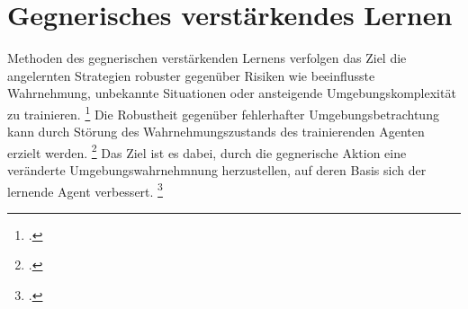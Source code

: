 \section{Gegnerisches verstärkendes Lernen}
Methoden des gegnerischen verstärkenden Lernens verfolgen das Ziel die angelernten Strategien robuster gegenüber Risiken wie beeinflusste Wahrnehmung, unbekannte Situationen oder ansteigende Umgebungskomplexität zu trainieren. \footcite[Vgl.][S. 2]{Schott.2022} %
Die Robustheit gegenüber fehlerhafter Umgebungsbetrachtung kann durch Störung des Wahrnehmungszustands des trainierenden Agenten erzielt werden. \footcite[Vgl.][S. 2]{Schott.2022}
Das Ziel ist es dabei, durch die gegnerische Aktion eine veränderte Umgebungswahrnehmnung herzustellen, auf deren Basis sich der lernende Agent verbessert. \footcite[Vgl.][S. 3]{Schott.2022}

